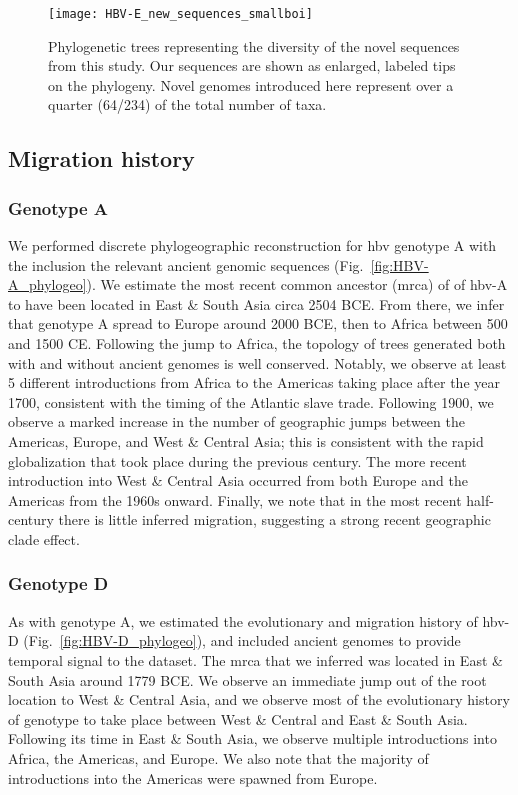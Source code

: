 \begin{figure}[ht]
  \centering
  \medskip
  \texttt{[image: HBV-E\_new\_sequences\_smallboi]}
  \caption[HBV-E New sequences]{Phylogenetic trees representing the diversity of the novel sequences from this study. Our sequences are shown as enlarged, labeled tips on the phylogeny. Novel genomes introduced here represent over a quarter (64/234) of the total number of taxa.}
  \label{fig:HBV-E_new_sequences}
\end{figure}

\subsection{Migration history}

\subsubsection{Genotype A}

We performed discrete phylogeographic reconstruction for \gls{hbv} genotype A with the inclusion the relevant ancient genomic sequences (Fig.~\ref{fig:HBV-A_phylogeo}).
We estimate the most recent common ancestor (\gls{mrca}) of of \gls{hbv}-A to have been located in East \& South Asia circa 2504 BCE.
From there, we infer that genotype A spread to Europe around 2000 BCE, then to Africa between 500 and 1500 CE.
Following the jump to Africa, the topology of trees generated both with and without ancient genomes is well conserved.
Notably, we observe at least 5 different introductions from Africa to the Americas taking place after the year 1700, consistent with the timing of the Atlantic slave trade.
Following 1900, we observe a marked increase in the number of geographic jumps between the Americas, Europe, and West \& Central Asia; this is consistent with the rapid globalization that took place during the previous century.
The more recent introduction into West \& Central Asia occurred from both Europe and the Americas from the 1960s onward.
Finally, we note that in the most recent half-century there is little inferred migration, suggesting a strong recent geographic clade effect.

\subsubsection{Genotype D}

As with genotype A, we estimated the evolutionary and migration history of \gls{hbv}-D (Fig.~\ref{fig:HBV-D_phylogeo}), and included ancient genomes to provide temporal signal to the dataset.
The \gls{mrca} that we inferred was located in East \& South Asia around 1779 BCE.
We observe an immediate jump out of the root location to West \& Central Asia, and we observe most of the evolutionary history of genotype to take place between West \& Central and East \& South Asia.
Following its time in East \& South Asia, we observe multiple introductions into Africa, the Americas, and Europe.
We also note that the majority of introductions into the Americas were spawned from Europe.

